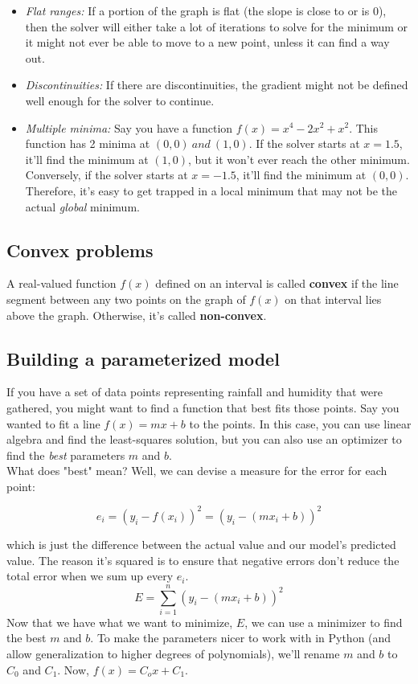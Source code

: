 \begin{itemize}
\item\textit{Flat ranges:} If a portion of the graph is flat (the slope is close to or is 0), then the solver will either take a lot of iterations to solve for the minimum or it might not ever be able to move to a new point, unless it can find a way out.
\item\textit{Discontinuities:} If there are discontinuities, the gradient might not be defined well enough for the solver to continue.
\item\textit{Multiple minima:} Say you have a function $f(x) = x^4-2x^2+x^2$. This function has 2 minima at $(0,0)\ and\ (1,0)$. If the solver starts at $x=1.5$, it'll find the minimum at $(1,0)$, but it won't ever reach the other minimum. Conversely, if the solver starts at $x=-1.5$, it'll find the minimum at $(0,0)$. Therefore, it's easy to get trapped in a local minimum that may not be the actual \textit{global} minimum.
\end{itemize}

\subsection{Convex problems}
\noindent A real-valued function $f(x)$ defined on an interval is called \textbf{convex} if the line segment between any two points on the graph of $f(x)$ on that interval lies above the graph. Otherwise, it's called \textbf{non-convex}.

\subsection{Building a parameterized model}
\noindent If you have a set of data points representing rainfall and humidity that were gathered, you might want to find a function that best fits those points. Say you wanted to fit a line $f(x) = mx + b$ to the points. In this case, you can use linear algebra and find the least-squares solution, but you can also use an optimizer to find the \textit{best} parameters $m$ and $b$.\\

\noindent What does "best" mean? Well, we can devise a measure for the error for each point:

\begin{equation*}
	e_i = (y_i - f(x_i))^2 = (y_i - (mx_i+b))^2
\end{equation*}

\noindent which is just the difference between the actual value and our model's predicted value. The reason it's squared is to ensure that negative errors don't reduce the total error when we sum up every $e_i$. 
\begin{equation*}
	E = \sum^{n}_{i=1}(y_i - (mx_i+b))^2
\end{equation*}
\noindent Now that we have what we want to minimize, $E$, we can use a minimizer to find the best $m$ and $b$. To make the parameters nicer to work with in Python (and allow generalization to higher degrees of polynomials), we'll rename $m$ and $b$ to $C_0$ and $C_1$. Now, $f(x) = C_ox+C_1$.

